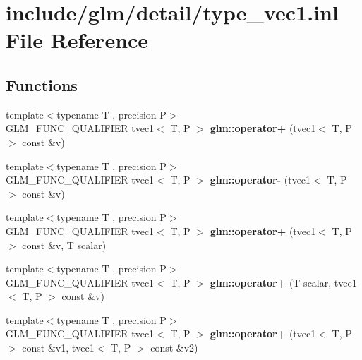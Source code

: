 \hypertarget{type__vec1_8inl}{}\section{include/glm/detail/type\+\_\+vec1.inl File Reference}
\label{type__vec1_8inl}
\subsection*{Functions}
\begin{DoxyCompactItemize}
\item 
\mbox{\label{type__vec1_8inl_ae4e916e7ac002004f4768efb4589dd5a}} 
{\footnotesize template$<$typename T , precision P$>$ }\\G\+L\+M\+\_\+\+F\+U\+N\+C\+\_\+\+Q\+U\+A\+L\+I\+F\+I\+ER tvec1$<$ T, P $>$ {\bfseries glm\+::operator+} (tvec1$<$ T, P $>$ const \&v)
\item 
\mbox{\label{type__vec1_8inl_ac3f9c05afa9b75ec6fdfe03148300a1d}} 
{\footnotesize template$<$typename T , precision P$>$ }\\G\+L\+M\+\_\+\+F\+U\+N\+C\+\_\+\+Q\+U\+A\+L\+I\+F\+I\+ER tvec1$<$ T, P $>$ {\bfseries glm\+::operator-\/} (tvec1$<$ T, P $>$ const \&v)
\item 
\mbox{\label{type__vec1_8inl_a1e29148fd52f9e292310bc4770efe6bb}} 
{\footnotesize template$<$typename T , precision P$>$ }\\G\+L\+M\+\_\+\+F\+U\+N\+C\+\_\+\+Q\+U\+A\+L\+I\+F\+I\+ER tvec1$<$ T, P $>$ {\bfseries glm\+::operator+} (tvec1$<$ T, P $>$ const \&v, T scalar)
\item 
\mbox{\label{type__vec1_8inl_ac49a335c497b922d289c266abee1bfd3}} 
{\footnotesize template$<$typename T , precision P$>$ }\\G\+L\+M\+\_\+\+F\+U\+N\+C\+\_\+\+Q\+U\+A\+L\+I\+F\+I\+ER tvec1$<$ T, P $>$ {\bfseries glm\+::operator+} (T scalar, tvec1$<$ T, P $>$ const \&v)
\item 
\mbox{\label{type__vec1_8inl_ae381e4d867bba4a184aea9bb1dd4032f}} 
{\footnotesize template$<$typename T , precision P$>$ }\\G\+L\+M\+\_\+\+F\+U\+N\+C\+\_\+\+Q\+U\+A\+L\+I\+F\+I\+ER tvec1$<$ T, P $>$ {\bfseries glm\+::operator+} (tvec1$<$ T, P $>$ const \&v1, tvec1$<$ T, P $>$ const \&v2)

\end{DoxyCompactItemize}
